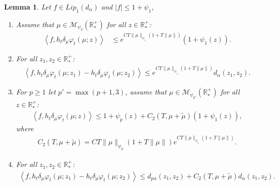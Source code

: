 \documentclass[11pt,a4paper]{article}
\newcommand{\RRP}{\mathbb{R}^+_*}
\newcommand{\MC}{\mathcal{M}}
\newcommand{\brac}[1]{\left\langle#1\right\rangle}
\newtheorem{lemma}[theorem]{Lemma}
\begin{document}
\begin{lemma}\label{lem:wass-rescaled-derivative}
    Let $f \in Lip_1(d_\alpha)$ and $|f| \leq 1 + \psi_1$,
    \begin{enumerate}[label=(\roman*)]
        \item Assume that $\mu \in \MC_{\psi_3}(\RRP)$ for all $z \in \RRP$:
        \begin{align*}
            \brac{f,h_t\delta_\mu \varphi_t(\mu;z)} &\leq e^{CT\|\mu\|_{\psi_1}\left(1 + T\|\mu\|\right)} (1 + \psi_1(z)).
        \end{align*}
        \item For all $z_1,z_2 \in \RRP$:
            \begin{align*}
                \brac{f,h_t\delta_\mu \varphi_t(\mu;z_1) - h_t\delta_\mu \varphi_t(\mu;z_2)} \leq e^{CT\|\mu\|_{\psi_1}\left(1 + T\|\mu\|\right)} d_\alpha(z_1,z_2) .
            \end{align*}
        \item For $p \geq 1$ let $p' = \max(p+1,3)$, assume that $\mu \in \MC_{\psi_{p'}}(\RRP)$ for all $z \in \RRP$:
            \begin{align*}
                \brac{f,h_t\delta_\mu \varphi_t(\mu;z)} \leq  1 + \psi_p(z) + C_2(T,\mu + \tilde{\mu})(1 + \psi_1(z)),
            \end{align*}
             where 
            \begin{align*}
                C_2(T,\mu + \tilde{\mu}) = CT \|\mu\|_{\psi_p}\left(1 + T\|\mu\|\right)e^{CT\|\mu\|_{\psi_1}\left(1 + T\|\mu\|\right)}.
            \end{align*}
        \item For all $z_1,z_2 \in \RRP$:
            \begin{align*}
                \brac{f,h_t\delta_\mu \varphi_t(\mu;z_1) - h_t\delta_\mu \varphi_t(\mu;z_2)} \leq d_{p\alpha}(z_1,z_2) + C_2(T,\mu + \tilde{\mu}) d_\alpha(z_1,z_2).
            \end{align*}
    \end{enumerate}
\end{lemma}
\end{document}
